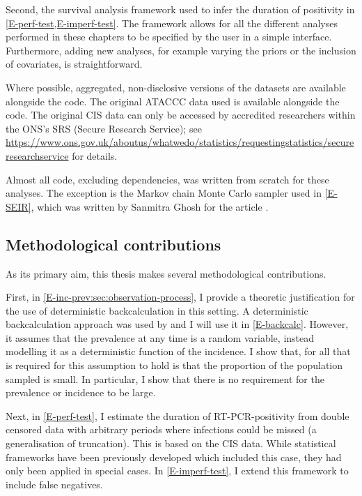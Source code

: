\documentclass[thesis.tex]{subfiles}
\begin{document}
Second, the survival analysis framework used to infer the duration of positivity in \cref{E-perf-test,E-imperf-test}.
The framework allows for all the different analyses performed in these chapters to be specified by the user in a simple interface.
Furthermore, adding new analyses, for example varying the priors or the inclusion of covariates, is straightforward.

Where possible, aggregated, non-disclosive versions of the datasets are available alongside the code.
The original ATACCC data used is available alongside the code.
The original CIS data can only be accessed by accredited researchers within the ONS's SRS (Secure Research Service); see \url{https://www.ons.gov.uk/aboutus/whatwedo/statistics/requestingstatistics/secureresearchservice} for details.

Almost all code, excluding dependencies, was written from scratch for these analyses.
The exception is the Markov chain Monte Carlo sampler used in \cref{E-SEIR}, which was written by Sanmitra Ghosh for the article \textcite{ghoshApproximate}.

\subsection{Methodological contributions}

As its primary aim, this thesis makes several methodological contributions.

First, in \cref{E-inc-prev:sec:observation-process}, I provide a theoretic justification for the use of deterministic backcalculation in this setting.
A deterministic backcalculation approach was used by \textcite{abbottCISincidence} and I will use it in \cref{E-backcalc}.
However, it assumes that the prevalence at any time is a random variable, instead modelling it as a deterministic function of the incidence.
I show that, for all that is required for this assumption to hold is that the proportion of the population sampled is small.
In particular, I show that there is no requirement for the prevalence or incidence to be large.

Next, in \cref{E-perf-test}, I estimate the duration of RT-PCR-positivity from double censored data with arbitrary periods where infections could be missed (a generalisation of truncation).
This is based on the CIS data.
While statistical frameworks have been previously developed which included this case, they had only been applied in special cases.
In \cref{E-imperf-test}, I extend this framework to include false negatives.
\end{document}

